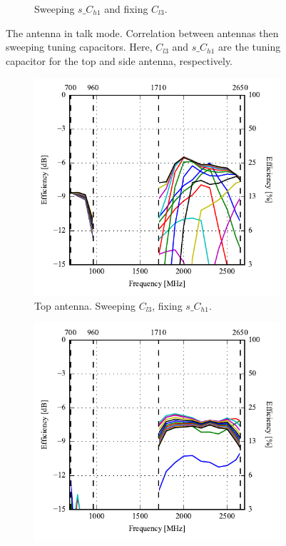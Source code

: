 \begin{figure}[htbp]
\begin{subfigure}{0.49\linewidth}
        \caption{Sweeping $s\_C_{h1}$ and fixing $C_{l3}$.}
    \end{subfigure}
    \caption{The antenna in talk mode. Correlation between antennas then sweeping tuning capacitors. Here, $C_{l3}$ and $s\_C_{h1}$ are the tuning capacitor for the top and side antenna, respectively.}
    \label{fig:corr_sol3_talk}
\end{figure}

\begin{figure}[htbp]
    \centering
    \begin{subfigure}{0.49\linewidth}
        \centering
        \includegraphics{img/tech_sol/nonresonant/simulation/talk_mode/EffSweepAC1/efficiency-ac1-top}
        \caption{Top antenna. Sweeping $C_{l3}$, fixing $s\_C_{h1}$.}
    \end{subfigure}
    \hfill
    \begin{subfigure}{0.49\linewidth}
        \centering
        \includegraphics{img/tech_sol/nonresonant/simulation/talk_mode/EffSweepAC2/efficiency-ac2-side}

\end{subfigure}
\end{figure}
